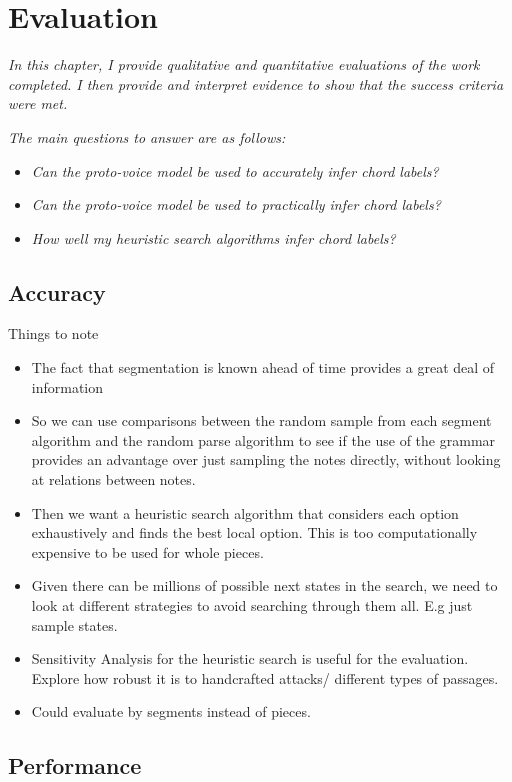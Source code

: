 \documentclass[12pt,a4paper,twoside,openright]{report}
\begin{document}
\chapter{Evaluation}
\textit{In this chapter, I provide qualitative and quantitative evaluations of the work completed. I then provide and interpret evidence to show that the success criteria were met.}

\textit{The main questions to answer are as follows:}
\begin{itemize}
  \item \textit{Can the proto-voice model be used to accurately infer chord labels?}
  \item \textit{Can the proto-voice model be used to practically infer chord labels?}
  \item \textit{How well my heuristic search algorithms infer chord labels?}
\end{itemize}

\section{Accuracy}
Things to note
\begin{itemize}
  \item The fact that segmentation is known ahead of time provides a great deal of information \cite{gothamWhatIfWhen2021}
  \item So we can use comparisons between the random sample from each segment algorithm and the random parse algorithm to see if the use of the grammar provides an advantage over just sampling the notes directly, without looking at relations between notes.
  \item Then we want a heuristic search algorithm that considers each option exhaustively and finds the best local option. This is too computationally expensive to be used for whole pieces. 
  \item Given there can be millions of possible next states in the search, we need to look at different strategies to avoid searching through them all. E.g just sample states. 
  \item Sensitivity Analysis for the heuristic search is useful for the evaluation. Explore how robust it is to handcrafted attacks/ different types of passages.
  \item Could evaluate by segments instead of pieces. 
\end{itemize}

\section{Performance}
\end{document}
